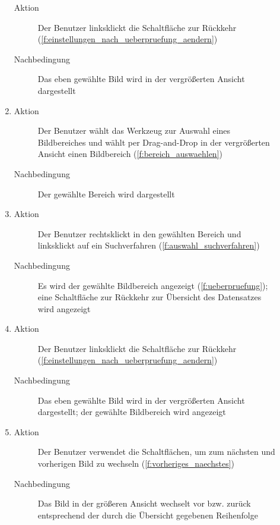 \begin{description}
\begin{enumerate}
		\begin{description}
			\item[Aktion] Der Benutzer linksklickt die Schaltfläche zur Rückkehr (\ref{f:einstellungen_nach_ueberpruefung_aendern})
			\item[Nachbedingung] Das eben gewählte Bild wird in der vergrößerten Ansicht dargestellt
		\end{description}
		\item
		\begin{description}
			\item[Aktion] Der Benutzer wählt das Werkzeug zur Auswahl eines Bildbereiches und wählt per Drag-and-Drop in der vergrößerten Ansicht einen Bildbereich (\ref{f:bereich_auswaehlen})
			\item[Nachbedingung] Der gewählte Bereich wird dargestellt
		\end{description}
		\item
		\begin{description}
			\item[Aktion] Der Benutzer rechtsklickt in den gewählten Bereich und linksklickt auf ein Suchverfahren (\ref{f:auswahl_suchverfahren})
			\item[Nachbedingung] Es wird der gewählte Bildbereich angezeigt (\ref{f:ueberpruefung}); eine Schaltfläche zur Rückkehr zur Übersicht des Datensatzes wird angezeigt
		\end{description}
		\item
		\begin{description}
			\item[Aktion] Der Benutzer linksklickt die Schaltfläche zur Rückkehr (\ref{f:einstellungen_nach_ueberpruefung_aendern})
			\item[Nachbedingung] Das eben gewählte Bild wird in der vergrößerten Ansicht dargestellt; der gewählte Bildbereich wird angezeigt
		\end{description}
		\item
		\begin{description}
			\item[Aktion] Der Benutzer verwendet die Schaltflächen, um zum nächsten und vorherigen Bild zu wechseln (\ref{f:vorheriges_naechstes})
			\item[Nachbedingung] Das Bild in der größeren Ansicht wechselt vor bzw. zurück entsprechend der durch die Übersicht gegebenen Reihenfolge
		\end{description}
	\end{enumerate}


\end{description}
